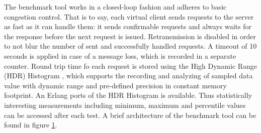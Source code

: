 The benchmark tool works in a closed-loop fashion and adheres to basic congestion control. That is to say, each virtual client sends requests to the server as fast as it can handle them: it sends confirmable requests and always waits for the response before the next request is issued. Retransmission is disabled in order to not blur the number of sent and successfully handled requests. A timeout of 10 seconds is applied in case of a message loss, which is recorded in a separate counter. Round trip time fo each request is stored using the High Dynamic Range (HDR) Histogram \cite{}, which supports the recording and analyzing of sampled data value with dynamic range and pre-defined precision in constant memory footprint. An Erlang ports of the HDR Histogram is available. Thus statistically interesting measurements including minimum, maximum and percentile values can be accessed after each test. A brief architecture of the benchmark tool can be found in figure \ref{fig:ecoap_bench}.

\begin{figure}[!htbp]
\centering
\caption{}
\label{fig:ecoap_bench}
\end{figure}





